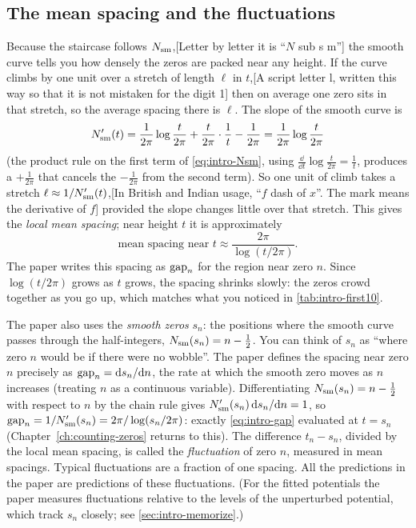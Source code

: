 \subsection{The mean spacing and the fluctuations}

Because the staircase follows $N_{\mathrm{sm}}$,[Letter by letter it is ``$N$ sub s m''] the smooth curve tells you how densely the zeros are packed near any height. If the curve climbs by one unit over a stretch of length $\ell$ in $t$,[A script letter l, written this way so that it is not mistaken for the digit 1] then on average one zero sits in that stretch, so the average spacing there is $\ell$. The slope of the smooth curve is
\[
N_{\mathrm{sm}}'(t) = \frac{1}{2\pi}\log\frac{t}{2\pi} + \frac{t}{2\pi}\cdot\frac{1}{t} - \frac{1}{2\pi} = \frac{1}{2\pi}\log\frac{t}{2\pi}
\]
(the product rule on the first term of \cref{eq:intro-Nsm}, using $\frac{\dd}{\dd t}\log\frac{t}{2\pi} = \frac1t$, produces a $+\frac{1}{2\pi}$ that cancels the $-\frac{1}{2\pi}$ from the second term). So one unit of climb takes a stretch $\ell \approx 1/N_{\mathrm{sm}}'(t)$,[In British and Indian usage, ``$f$ dash of $x$''. The mark means the derivative of $f$] provided the slope changes little over that stretch. This gives the \emph{local mean spacing}; near height $t$ it is approximately
\begin{equation}
\text{mean spacing near } t \approx \frac{2\pi}{\log(t/2\pi)} .
\label{eq:intro-gap}
\end{equation}
The paper writes this spacing as $\mathrm{gap}_n$ for the region near zero $n$. Since $\log(t/2\pi)$ grows as $t$ grows, the spacing shrinks slowly: the zeros crowd together as you go up, which matches what you noticed in \cref{tab:intro-first10}.

The paper also uses the \emph{smooth zeros} $s_n$: the positions where the smooth curve passes through the half-integers, $N_{\mathrm{sm}}(s_n) = n - \tfrac12$. You can think of $s_n$ as ``where zero $n$ would be if there were no wobble''. The paper defines the spacing near zero $n$ precisely as $\mathrm{gap}_n = \mathrm{d} s_n/\mathrm{d} n$, the rate at which the smooth zero moves as $n$ increases (treating $n$ as a continuous variable). Differentiating $N_{\mathrm{sm}}(s_n) = n - \tfrac12$ with respect to $n$ by the chain rule gives $N_{\mathrm{sm}}'(s_n)\,\mathrm{d} s_n/\mathrm{d} n = 1$, so $\mathrm{gap}_n = 1/N_{\mathrm{sm}}'(s_n) = 2\pi/\log(s_n/2\pi)$: exactly \cref{eq:intro-gap} evaluated at $t = s_n$ (Chapter~\ref{ch:counting-zeros} returns to this). The difference $t_n - s_n$, divided by the local mean spacing, is called the \emph{fluctuation} of zero $n$, measured in mean spacings. Typical fluctuations are a fraction of one spacing. All the predictions in the paper are predictions of these fluctuations. (For the fitted potentials the paper measures fluctuations relative to the levels of the unperturbed potential, which track $s_n$ closely; see \cref{sec:intro-memorize}.)

